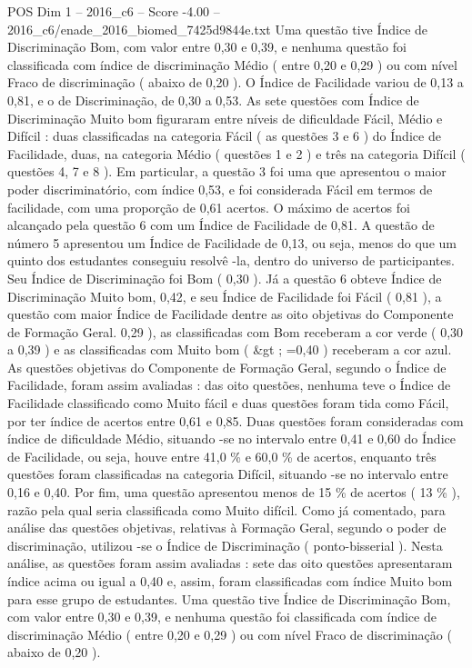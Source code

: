 \begin{textsample}{POS Dim 1 – 2016\_c6 – Score -4.00 – 2016\_c6/enade\_2016\_biomed\_7425d9844e.txt}
Uma questão tive Índice de Discriminação Bom, com valor entre 0,30 e 0,39, e nenhuma questão foi classificada com índice de discriminação Médio ( entre 0,20 e 0,29 ) ou com nível Fraco de discriminação ( abaixo de 0,20 ).
O Índice de Facilidade variou de 0,13 a 0,81, e o de Discriminação, de 0,30 a 0,53.
As sete questões com Índice de Discriminação Muito bom figuraram entre níveis de dificuldade Fácil, Médio e Difícil : duas classificadas na categoria Fácil ( as questões 3 e 6 ) do Índice de Facilidade, duas, na categoria Médio ( questões 1 e 2 ) e três na categoria Difícil ( questões 4, 7 e 8 ).
Em particular, a questão 3 foi uma que apresentou o maior poder discriminatório, com índice 0,53, e foi considerada Fácil em termos de facilidade, com uma proporção de 0,61 acertos.
O máximo de acertos foi alcançado pela questão 6 com um Índice de Facilidade de 0,81.
A questão de número 5 apresentou um Índice de Facilidade de 0,13, ou seja, menos do que um quinto dos estudantes conseguiu resolvê -la, dentro do universo de participantes.
Seu Índice de Discriminação foi Bom ( 0,30 ).
Já a questão 6 obteve Índice de Discriminação Muito bom, 0,42, e seu Índice de Facilidade foi Fácil ( 0,81 ), a questão com maior Índice de Facilidade dentre as oito objetivas do Componente de Formação Geral. 0,29 ), as classificadas com Bom receberam a cor verde ( 0,30 a 0,39 ) e as classificadas com Muito bom ( \&gt ; =0,40 ) receberam a cor azul.
As questões objetivas do Componente de Formação Geral, segundo o Índice de Facilidade, foram assim avaliadas : das oito questões, nenhuma teve o Índice de Facilidade classificado como Muito fácil e duas questões foram tida como Fácil, por ter índice de acertos entre 0,61 e 0,85.
Duas questões foram consideradas com índice de dificuldade Médio, situando -se no intervalo entre 0,41 e 0,60 do Índice de Facilidade, ou seja, houve entre 41,0 \% e 60,0 \% de acertos, enquanto três questões foram classificadas na categoria Difícil, situando -se no intervalo entre 0,16 e 0,40.
Por fim, uma questão apresentou menos de 15 \% de acertos ( 13 \% ), razão pela qual seria classificada como Muito difícil.
Como já comentado, para análise das questões objetivas, relativas à Formação Geral, segundo o poder de discriminação, utilizou -se o Índice de Discriminação ( ponto-bisserial ).
Nesta análise, as questões foram assim avaliadas : sete das oito questões apresentaram índice acima ou igual a 0,40 e, assim, foram classificadas com índice Muito bom para esse grupo de estudantes.
Uma questão tive Índice de Discriminação Bom, com valor entre 0,30 e 0,39, e nenhuma questão foi classificada com índice de discriminação Médio ( entre 0,20 e 0,29 ) ou com nível Fraco de discriminação ( abaixo de 0,20 ).

\end{textsample}
